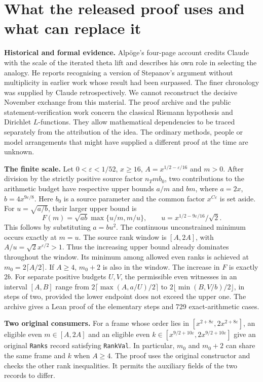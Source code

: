\documentclass[11pt,a4paper]{article}
\newcommand{\lead}[1]{\textbf{#1}\enspace}
\begin{document}
\section{What the released proof uses and what can replace it}\label{sec:ranktransfer}
\lead{Historical and formal evidence.} Alpöge's four-page account credits Claude with the scale of the iterated theta lift and describes his own role in selecting the analogy. He reports recognising a version of Stepanov's argument without multiplicity in earlier work whose result had been surpassed. The finer chronology was supplied by Claude retrospectively. We cannot reconstruct the decisive November exchange from this material. The proof archive and the public statement-verification work concern the classical Riemann hypothesis and Dirichlet \(L\)-functions. They allow mathematical dependencies to be traced separately from the attribution of the idea. The ordinary methods, people or model arrangements that might have supplied a different proof at the time are unknown.

\lead{The finite scale.} Let \(0<\varepsilon<1/52\), \(x\geq16\), \(A=x^{1/2-\varepsilon/16}\) and \(m>0\). After division by the strictly positive source factor \(n_Tmb_0\), two contributions to the arithmetic budget have respective upper bounds \(a/m\) and \(bm\), where \(a=2x\), \(b=4x^{9\varepsilon/8}\). Here \(b_0\) is a source parameter and the common factor \(x^{C\varepsilon}\) is set aside. For \(u=\sqrt{a/b}\), their larger upper bound is
\[
F(m)=\sqrt{ab}\max\{u/m,m/u\},\qquad
u=x^{1/2-9\varepsilon/16}/\sqrt{2}.
\]
This follows by substituting \(a=bu^2\). The continuous unconstrained minimum occurs exactly at \(m=u\). The source rank window is \([A,2A]\), with \(A/u=\sqrt{2}x^{\varepsilon/2}>1\). Thus the increasing upper bound already dominates throughout the window. Its minimum among allowed even ranks is achieved at \(m_0=2\lceil A/2\rceil\). If \(A\geq4\), \(m_0+2\) is also in the window. The increase in \(F\) is exactly \(2b\). For separate positive budgets \(U,V\), the permissible even witnesses in an interval \([A,B]\) range from \(2\lceil\max(A,a/U)/2\rceil\) to \(2\lfloor\min(B,V/b)/2\rfloor\), in steps of two, provided the lower endpoint does not exceed the upper one. The archive gives a Lean proof of the elementary steps and 729 exact-arithmetic cases.

\lead{Two original consumers.} For a frame whose order lies in \([x^{2+8\varepsilon},2x^{2+8\varepsilon}]\), an eligible even \(m\in[A,2A]\) and an eligible even \(k\in[x^{9/2+10\varepsilon},2x^{9/2+10\varepsilon}]\) give an original \texttt{Ranks} record satisfying \texttt{RankVal}. In particular, \(m_0\) and \(m_0+2\) can share the same frame and \(k\) when \(A\geq4\). The proof uses the original constructor and checks the other rank inequalities. It permits the auxiliary fields of the two records to differ.
\end{document}
